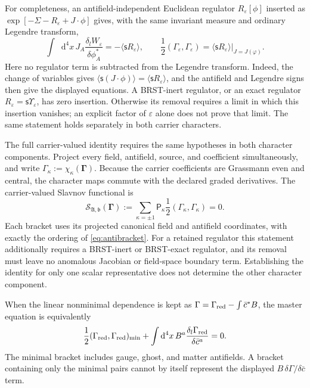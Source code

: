 \documentclass[final,5p,times,twocolumn,numbers,nopreprintline]{elsarticle}
\numberwithin{equation}{section}
\theoremstyle{definition}
\theoremstyle{remark}
\newcommand{\dd}{\mathop{}\!\mathrm d}
\newcommand{\bb}{\mathfrak b}
\newcommand{\BR}{\mathsf s}
\newcommand{\vct}[1]{\boldsymbol{#1}}
\begin{document}
For completeness, an antifield-independent Euclidean regulator
\(R_\varepsilon[\phi]\) inserted as
\(\exp[-\Sigma-R_\varepsilon+J\cdot\phi]\) gives, with the
same invariant measure and ordinary Legendre transform,
\begin{equation}
 \int\dd^4x\,J_A
       \frac{\delta_l W_\varepsilon}{\delta\phi_A^*}
       =-\langle\BR R_\varepsilon\rangle,\qquad
 \frac12(\Gamma_\varepsilon,\Gamma_\varepsilon)
       =\left.\langle\BR R_\varepsilon\rangle
          \right|_{J=J(\varphi)} .
 \label{eq:regulated-ST-breaking}
\end{equation}
Here no regulator term is subtracted from the Legendre transform.
Indeed, the change of variables gives
\(\langle\BR(J\cdot\phi)\rangle
  =\langle\BR R_\varepsilon\rangle\), and the antifield and
Legendre signs then give the displayed equations. A BRST-inert
regulator, or an exact regulator \(R_\varepsilon=\BR\Upsilon_\varepsilon\),
has zero insertion. Otherwise its removal requires a limit in
which this insertion vanishes; an explicit factor of
\(\varepsilon\) alone does not prove that limit. The same
statement holds separately in both carrier characters.

The full carrier-valued identity requires the same hypotheses in
both character components. Project every field, antifield, source,
and coefficient simultaneously, and write
\(\Gamma_{\kappa}
  :=\chi_\kappa(\vct\Gamma)\).
Because the carrier coefficients are Grassmann even and central,
the character maps commute with the declared graded derivatives.
The carrier-valued Slavnov functional is
\begin{equation}
 \mathcal S_{\mathfrak A,\bb}(\vct\Gamma)
  :=\sum_{\kappa=\pm1}\mathsf P_\kappa
        \frac12(\Gamma_{\kappa},\Gamma_{\kappa})
  =0.
 \label{eq:carrier-ST}
\end{equation}
Each bracket uses its projected canonical field and antifield
coordinates, with exactly the ordering of \eqref{eq:antibracket}.
For a retained regulator this statement additionally requires a
BRST-inert or BRST-exact regulator, and its removal must leave no
anomalous Jacobian or field-space boundary term. Establishing the
identity for only one scalar representative does not determine the
other character component.

When the linear nonminimal dependence is kept as
\(\Gamma=\Gamma_{\rm red}-\int\bar c^*B\), the master equation
is equivalently
\begin{equation}
 \frac12(\Gamma_{\rm red},\Gamma_{\rm red})_{\rm min}
       +\int\dd^4x\,B^a
             \frac{\delta_l\Gamma_{\rm red}}{\delta\bar c^a}=0 .
 \label{eq:reduced-ST}
\end{equation}
The minimal bracket includes gauge, ghost, and matter antifields.
A bracket containing only the minimal pairs cannot by itself
represent the displayed \(B\,\delta\Gamma/\delta\bar c\) term.
\end{document}

